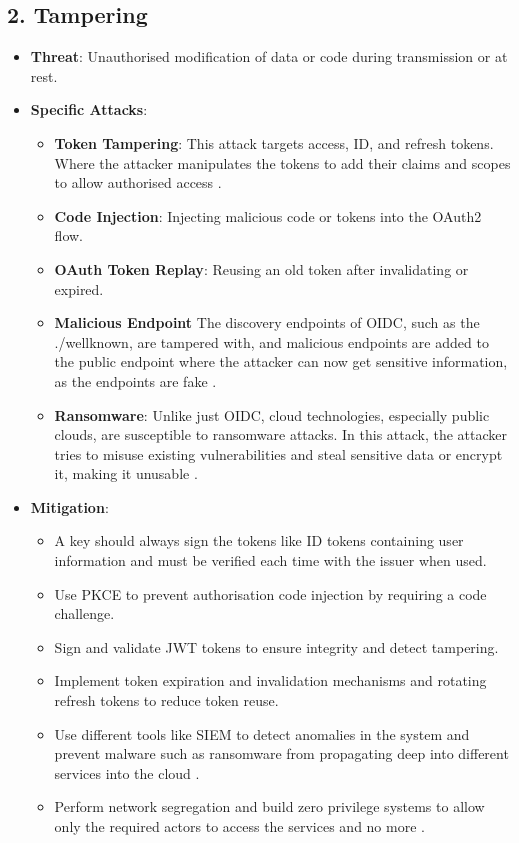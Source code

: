 \subsection*{2. Tampering}
\begin{itemize}
    \item \textbf{Threat}: Unauthorised modification of data or code during transmission or at rest.
    \item \textbf{Specific Attacks}:
    \begin{itemize}
        \item \textbf{Token Tampering}: This attack targets access, ID, and refresh tokens. Where the attacker manipulates the tokens to add their claims and scopes to allow authorised access \citep{oidc_attacks}.
        \item \textbf{Code Injection}: Injecting malicious code or tokens into the OAuth2 flow.
        \item \textbf{OAuth Token Replay}: Reusing an old token after invalidating or expired.
        \item \textbf{Malicious Endpoint} The discovery endpoints of OIDC, such as the ./wellknown, are tampered with, and malicious endpoints are added to the public endpoint where the attacker can now get sensitive information, as the endpoints are fake \citep{oidc_attacks}.
        \item \textbf{Ransomware}: Unlike just OIDC, cloud technologies, especially public clouds, are susceptible to ransomware attacks. In this attack, the attacker tries to misuse existing vulnerabilities and steal sensitive data or encrypt it, making it unusable \citep{ransomeware}.
    \end{itemize}
    \item \textbf{Mitigation}:
    \begin{itemize}
         \item A key should always sign the tokens like ID tokens containing user information and must be verified each time with the issuer when used.
        \item Use PKCE to prevent authorisation code injection by requiring a code challenge.
        \item Sign and validate JWT tokens to ensure integrity and detect tampering.
        \item Implement token expiration and invalidation mechanisms and rotating refresh tokens to reduce token reuse.
        \item Use different tools like SIEM to detect anomalies in the system and prevent malware such as ransomware from propagating deep into different services into the cloud \citep{ransomeware}.
        \item Perform network segregation and build zero privilege systems to allow only the required actors to access the services and no more \citep{zero_trust}. 
    \end{itemize}
\end{itemize}

